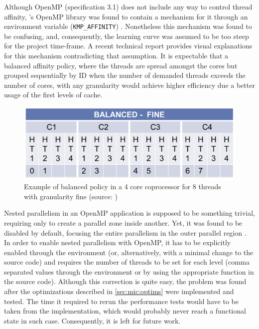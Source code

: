 \documentclass[../thesis]{subfiles}
\begin{document}
	Although OpenMP (specification 3.1) does not include any way to control thread affinity, \intel's OpenMP library was found to contain a mechanism for it through an environment variable (\texttt{KMP\_AFFINITY}) \cite{PRACE:MIC:BestPracticeGuide}. Nonetheless this mechanism was found to be confusing, and, consequently, the learning curve was assumed to be too steep for the project time-frame. A recent technical report \cite{CESGA:MIC:Evaluation} provides visual explanations for this mechanism contradicting that assumption. It is expectable that a balanced affinity policy, where the threads are spread amongst the cores but grouped sequentially by ID when the number of demanded threads exceeds the number of cores, with any granularity would achieve higher efficiency due a better usage of the first levels of cache.

	\begin{figure}
		\begin{center}
			\includegraphics[width=\textwidth]{assets/images/kmp_affinity_balanced.png}
		\end{center}
		\caption{Example of balanced policy in a 4 core coprocessor for 8 threads with granularity fine (source: \cite{CESGA:MIC:Evaluation})}
		\label{fig:kmp_affinity:balanced}
	\end{figure}

	Nested parallelism in an OpenMP application is supposed to be something trivial, requiring only to create a parallel zone inside another. Yet, it was found to be disabled by default, focusing the entire parallelism in the outer parallel region \cite{PRACE:MIC:BestPracticeGuide}. In order to enable nested parallelism with OpenMP, it has to be explicitly enabled through the environment (or, alternatively, with a minimal change to the source code) and requires the number of threads to be set for each level (comma separated values through the environment or by using the appropriate function in the source code). Although this correction is quite easy, the problem was found after the optimizations described in \cref{sec:mic:optims} were implemented and tested. The time it required to rerun the performance tests would have to be taken from the \cuda implementation, which would probably never reach a functional state in such case. Consequently, it is left for future work.
\end{document}

